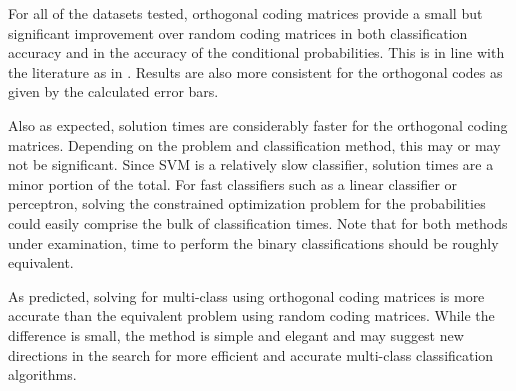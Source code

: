 For all of the datasets tested, orthogonal coding matrices provide a small but
significant improvement over random coding matrices in both classification
accuracy and in the accuracy of the conditional probabilities.
This is in line with the literature as in \citet{Dietterich_Bakiri1995,Windeatt_Ghaderi2002}.
Results are also more consistent for the orthogonal codes as given by the
calculated error bars.

Also as expected, solution times are
considerably faster for the orthogonal coding matrices.
Depending on the problem and classification method, this may or may not
be significant.
Since SVM is a relatively slow classifier, solution times
are a minor portion of the total.
For fast classifiers such as a linear classifier or perceptron,
solving the constrained optimization problem for the probabilities
could easily comprise the bulk of classification times.
Note that for both methods under examination, time to perform the binary
classifications should be roughly equivalent.

As predicted, solving for multi-class using orthogonal coding matrices 
is more accurate than the equivalent problem using random coding matrices.
While the difference is small,
the method is simple and elegant and
may suggest new directions in the search for more efficient and
accurate multi-class classification algorithms.

